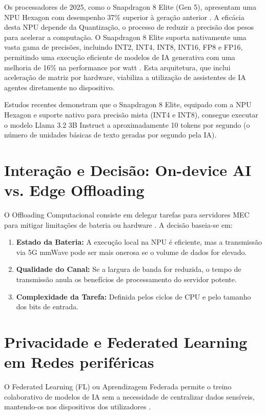 \documentclass[runningheads]{llncs}
\begin{document}
Os processadores de 2025, como o Snapdragon 8 Elite (Gen 5), apresentam uma NPU Hexagon com desempenho 37\% superior à geração anterior \cite{qualcomm2025}. A eficácia desta NPU depende da Quantização, o processo de reduzir a precisão dos pesos para acelerar a computação. O Snapdragon 8 Elite suporta nativamente uma vasta gama de precisões, incluindo INT2, INT4, INT8, INT16, FP8 e FP16, permitindo uma execução eficiente de modelos de IA generativa com uma melhoria de 16\% na performance por watt \cite{qualcomm2025}. Esta arquitetura, que inclui aceleração de matriz por hardware, viabiliza a utilização de assistentes de IA agentes diretamente no dispositivo.

Estudos recentes \cite{grapeup2024} demonstram que o Snapdragon 8 Elite, equipado com a NPU Hexagon e suporte nativo para precisão mista (INT4 e INT8), consegue executar o modelo Llama 3.2 3B Instruct a aproximadamente 10 tokens por segundo (o número de unidades básicas de texto geradas por segundo pela IA).

\section{Interação e Decisão: On-device AI vs. Edge Offloading}
O Offloading Computacional consiste em delegar tarefas para servidores MEC para mitigar limitações de bateria ou hardware \cite{pmc2022}. A decisão baseia-se em:

\begin{enumerate}
    \item \textbf{Estado da Bateria:} A execução local na NPU é eficiente, mas a transmissão via 5G mmWave pode ser mais onerosa se o volume de dados for elevado.
    \item \textbf{Qualidade do Canal:} Se a largura de banda for reduzida, o tempo de transmissão anula os benefícios de processamento do servidor potente.
    \item \textbf{Complexidade da Tarefa:} Definida pelos ciclos de CPU e pelo tamanho dos bits de entrada.
\end{enumerate}

\section{Privacidade e Federated Learning em Redes periféricas}
O Federated Learning (FL) ou Aprendizagem Federada permite o treino colaborativo de modelos de IA sem a necessidade de centralizar dados sensíveis, mantendo-os nos dispositivos dos utilizadores \cite{pmc2022}.
\end{document}
